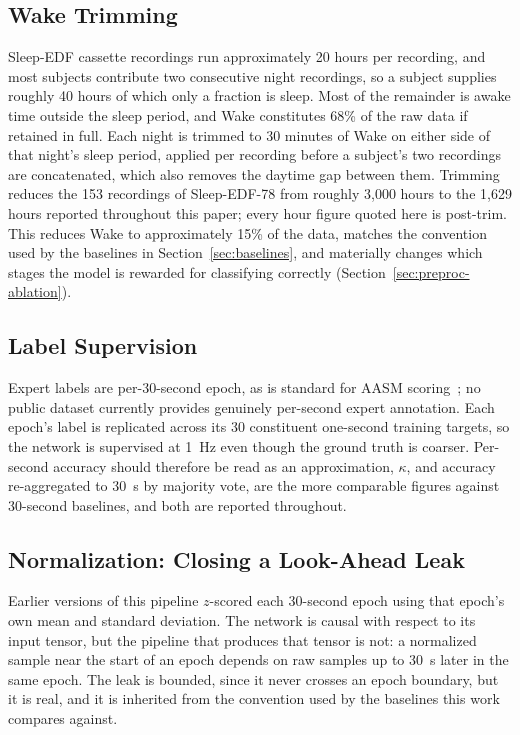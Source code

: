 \documentclass[conference]{IEEEtran}
\begin{document}
\subsection{Wake Trimming}

Sleep-EDF cassette recordings run approximately 20 hours per recording, and most subjects
contribute two consecutive night recordings, so a subject supplies roughly 40 hours of which
only a fraction is sleep. Most of the remainder is awake time outside the sleep period, and
Wake constitutes 68\% of the raw data if retained in full. Each night is trimmed to 30
minutes of Wake on either side of that night's sleep period, applied per recording before a
subject's two recordings are concatenated, which also removes the daytime gap between them.
Trimming reduces the 153 recordings of Sleep-EDF-78 from roughly 3{,}000 hours to the 1{,}629
hours reported throughout this paper; every hour figure quoted here is post-trim. This
reduces Wake to approximately 15\% of the data, matches the convention used by the baselines
in Section~\ref{sec:baselines}, and materially changes which stages the model is rewarded for
classifying correctly (Section~\ref{sec:preproc-ablation}).

\subsection{Label Supervision}

Expert labels are per-30-second epoch, as is standard for AASM scoring~\cite{aasm}; no public
dataset currently provides genuinely per-second expert annotation. Each epoch's label is
replicated across its 30 constituent one-second training targets, so the network is supervised
at 1~Hz even though the ground truth is coarser. Per-second accuracy should therefore be read
as an approximation, $\kappa$, and accuracy re-aggregated to 30~s by majority vote, are the
more comparable figures against 30-second baselines, and both are reported throughout.

\sloppy
\subsection{Normalization: Closing a Look-Ahead Leak}
\label{sec:norm}

Earlier versions of this pipeline $z$-scored each 30-second epoch using that epoch's own mean
and standard deviation. The network is causal with respect to its input tensor, but the
pipeline that produces that tensor is not: a normalized sample near the start of an epoch
depends on raw samples up to 30~s later in the same epoch. The leak is bounded, since it never
crosses an epoch boundary, but it is real, and it is inherited from the convention used by the
baselines this work compares against.
\end{document}
